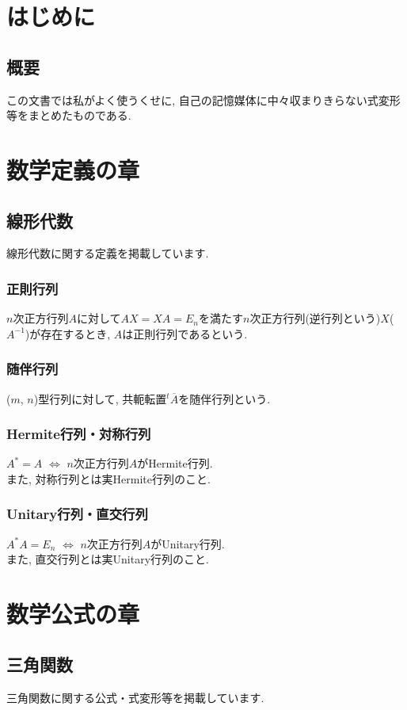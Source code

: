 \documentclass[]{jreport}
\begin{document}
\part{はじめに}
\chapter{概要}
この文書では私がよく使うくせに, 自己の記憶媒体に中々収まりきらない式変形等をまとめたものである.

\part{数学定義の章}
\chapter{線形代数}
線形代数に関する定義を掲載しています.
\section{正則行列}
$n$次正方行列$A$に対して$AX=XA=E_n$を満たす$n$次正方行列(逆行列という)$X$($A^{-1}$)が存在するとき, $A$は正則行列であるという.

\section{随伴行列}
($m$, $n$)型行列に対して, 共軛転置${}^{t}\overline{A}$を随伴行列という.

\section{Hermite行列・対称行列}
$A^*=A$ $\Leftrightarrow$ $n$次正方行列$A$がHermite行列.\\
また, 対称行列とは実Hermite行列のこと.

\section{Unitary行列・直交行列}
$A^*A=E_n$ $\Leftrightarrow$ $n$次正方行列$A$がUnitary行列.\\
また, 直交行列とは実Unitary行列のこと.

\part{数学公式の章}
\chapter{三角関数}
三角関数に関する公式・式変形等を掲載しています.
\end{document}
